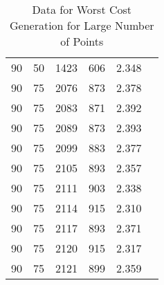 \begin{table}[!ht]
{\begin{tabular}{|c|c|c|c|c|c|}
90  & 50   & 1423       & 606	& 2.348  \\
90  & 75   & 2076       & 873	& 2.378  \\
90  & 75   & 2083       & 871	& 2.392  \\
90  & 75   & 2089       & 873	& 2.393  \\
90  & 75   & 2099       & 883	& 2.377  \\
90  & 75   & 2105       & 893	& 2.357  \\
90  & 75   & 2111       & 903	& 2.338  \\
90  & 75   & 2114       & 915	& 2.310  \\
90  & 75   & 2117       & 893	& 2.371  \\
90  & 75   & 2120       & 915	& 2.317  \\
90  & 75   & 2121       & 899	& 2.359  \\
\hline
\end{tabular}
}
\caption{Data for Worst Cost Generation for Large Number of Points}
\label{tab:worst-approx-ratio}
\end{table}